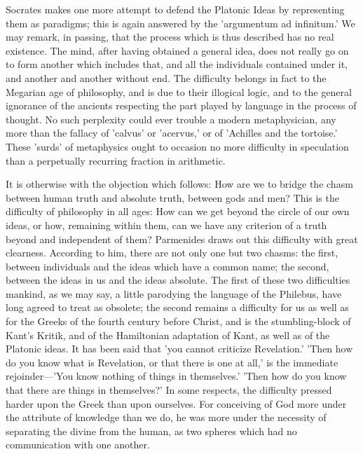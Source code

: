 \documentclass[11pt,letter]{article}
\begin{document}
\par  Socrates makes one more attempt to defend the Platonic Ideas by representing them as paradigms; this is again answered by the 'argumentum ad infinitum.' We may remark, in passing, that the process which is thus described has no real existence. The mind, after having obtained a general idea, does not really go on to form another which includes that, and all the individuals contained under it, and another and another without end. The difficulty belongs in fact to the Megarian age of philosophy, and is due to their illogical logic, and to the general ignorance of the ancients respecting the part played by language in the process of thought. No such perplexity could ever trouble a modern metaphysician, any more than the fallacy of 'calvus' or 'acervus,' or of 'Achilles and the tortoise.' These 'surds' of metaphysics ought to occasion no more difficulty in speculation than a perpetually recurring fraction in arithmetic.

\par  It is otherwise with the objection which follows: How are we to bridge the chasm between human truth and absolute truth, between gods and men? This is the difficulty of philosophy in all ages: How can we get beyond the circle of our own ideas, or how, remaining within them, can we have any criterion of a truth beyond and independent of them? Parmenides draws out this difficulty with great clearness. According to him, there are not only one but two chasms: the first, between individuals and the ideas which have a common name; the second, between the ideas in us and the ideas absolute. The first of these two difficulties mankind, as we may say, a little parodying the language of the Philebus, have long agreed to treat as obsolete; the second remains a difficulty for us as well as for the Greeks of the fourth century before Christ, and is the stumbling-block of Kant's Kritik, and of the Hamiltonian adaptation of Kant, as well as of the Platonic ideas. It has been said that 'you cannot criticize Revelation.' 'Then how do you know what is Revelation, or that there is one at all,' is the immediate rejoinder—'You know nothing of things in themselves.' 'Then how do you know that there are things in themselves?' In some respects, the difficulty pressed harder upon the Greek than upon ourselves. For conceiving of God more under the attribute of knowledge than we do, he was more under the necessity of separating the divine from the human, as two spheres which had no communication with one another.
\end{document}
